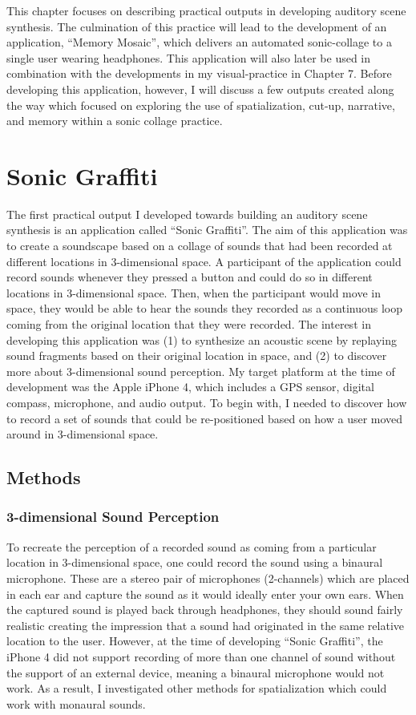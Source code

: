 \documentclass[a4paper,10pt,final]{ThesisStyle}
\begin{document}
This chapter focuses on describing practical outputs in developing auditory scene synthesis.  The culmination of this practice will lead to the development of an application, ``Memory Mosaic'', which delivers an automated sonic-collage to a single user wearing headphones.  This application will also later be used in combination with the developments in my visual-practice in Chapter 7.   Before developing this application, however, I will discuss a few outputs created along the way which focused on exploring the use of spatialization, cut-up, narrative, and memory within a sonic collage practice.  

\section{Sonic Graffiti}

The first practical output I developed towards building an auditory scene synthesis is an application called ``Sonic Graffiti''.  The aim of this application was to create a soundscape based on a collage of sounds that had been recorded at different locations in 3-dimensional space.  A participant of the application could record sounds whenever they pressed a button and could do so in different locations in 3-dimensional space.  Then, when the participant would move in space, they would be able to hear the sounds they recorded as a continuous loop coming from the original location that they were recorded.  The interest in developing this application was (1) to synthesize an acoustic scene by replaying sound fragments based on their original location in space, and (2) to discover more about 3-dimensional sound perception.  My target platform at the time of development was the Apple iPhone 4, which includes a GPS sensor, digital compass, microphone, and audio output.  To begin with, I needed to discover how to record a set of sounds that could be re-positioned based on how a user moved around in 3-dimensional space.

\subsection{Methods}

\subsubsection{3-dimensional Sound Perception}\label{sec:binauralization}
To recreate the perception of a recorded sound as coming from a particular location in 3-dimensional space, one could record the sound using a binaural microphone.  These are a stereo pair of microphones (2-channels) which are placed in each ear and capture the sound as it would ideally enter your own ears.  When the captured sound is played back through headphones, they should sound fairly realistic creating the impression that a sound had originated in the same relative location to the user.  However, at the time of developing ``Sonic Graffiti'', the iPhone 4 did not support recording of more than one channel of sound without the support of an external device, meaning a binaural microphone would not work.  As a result, I investigated other methods for spatialization which could work with monaural sounds.
\end{document}
